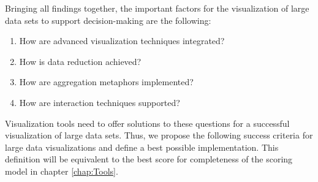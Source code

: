 Bringing all findings together, the important factors for the visualization of large data sets to support decision-making are the following: 
\begin{enumerate}[noitemsep]
\item How are advanced visualization techniques integrated? 
\item How is data reduction achieved? 
\item How are aggregation metaphors implemented? 
\item How are interaction techniques supported?
\end{enumerate}

Visualization tools need to offer solutions to these questions for a successful visualization of large data sets. Thus, we propose the following success criteria for large data visualizations and define a best possible implementation. This definition will be equivalent to the best score for completeness of the scoring model in chapter \ref{chap:Tools}.
